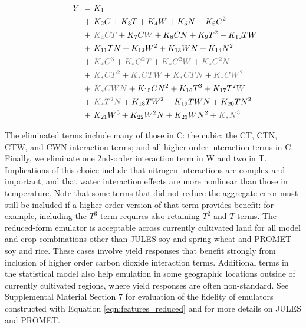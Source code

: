 \documentclass[gmdd]{copernicus} %
\begin{document}
\vspace{-0.1in}
\begin{align}
    \hspace{10mm}  \label{eqn:features_reduced}
        Y\ = \ & K_{1} \\
        + \ & K_{2} C                        + K_{3} T                        + K_{4} W                        + K_{5} N       + K_{6} C^2      \nonumber \\
        + \ & {\color{dark-gray}K_{a} C T}   + K_{7} C W                      + K_{8} C N                      + K_{9} T^2     + K_{10} T W     \nonumber \\
        + \ & K_{11} T N                     + K_{12} W^2                     + K_{13} W N                     + K_{14} N^2                     \nonumber \\
        + \ & {\color{dark-gray}K_{*} C^3}   + {\color{dark-gray}K_{*} C^2 T} + {\color{dark-gray}K_{*} C^2 W} + {\color{dark-gray}K_{*} C^2 N} \nonumber \\
        + \ & {\color{dark-gray}K_{*} C T^2} + {\color{dark-gray}K_{*} C T W} + {\color{dark-gray}K_{*} C T N} + {\color{dark-gray}K_{*} C W^2} \nonumber \\
        + \ & {\color{dark-gray}K_{*} C W N} + K_{15} C N^2                   + K_{16} T^3                     + K_{17} T^2 W                   \nonumber \\
        + \ & {\color{dark-gray}K_{*} T^2 N} + K_{18} T W^2                   + K_{19} T W N                   + K_{20} T N^2                   \nonumber \\
        + \ & K_{21} W^3                     + K_{22} W^2 N                   + K_{23} W N^2                   + {\color{dark-gray}K_{*} N^3}   \nonumber
\end{align}

\noindent The eliminated terms include many of those in C: the cubic; the CT, CTN, CTW, and CWN interaction terms; and all higher order interaction terms in C. 
Finally, we eliminate one 2nd-order interaction term in W and two in T. 
Implications of this choice include that nitrogen interactions are complex and important, and that water interaction effects are more nonlinear than those in temperature.  
Note that some terms that did not reduce the aggregate error must still be included if a higher order version of that term provides benefit: for example, including the $T^3$ term requires also retaining $T^2$ and $T$ terms. 
The reduced-form emulator is acceptable across currently cultivated land for all model and crop combinations other than JULES soy and spring wheat and PROMET soy and rice.
These cases involve yield responses that benefit strongly from inclusion of higher order carbon dioxide interaction terms. 
Additional terms in the statistical model also help emulation in some geographic locations outside of currently cultivated regions, where yield responses are often non-standard. 
See Supplemental Material Section 7 for evaluation of the fidelity of emulators constructed with Equation \ref{eqn:features_reduced} and for more details on JULES and PROMET.
\end{document}
